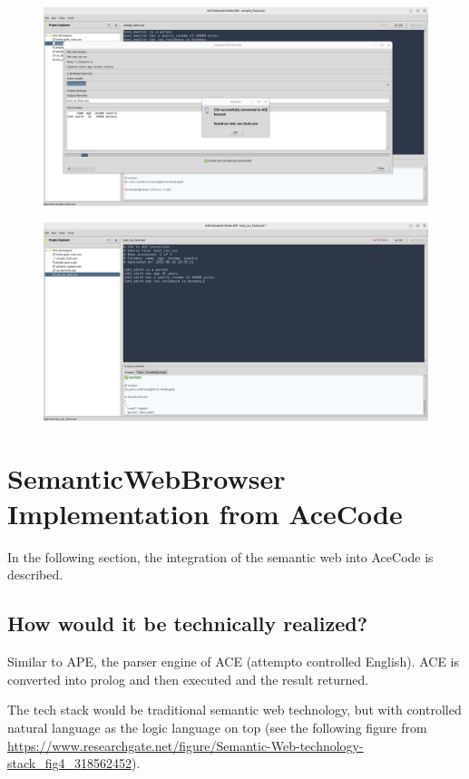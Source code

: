 \documentclass[12pt,a4paper]{article}
\begin{document}
\begin{figure}[h]
    \includegraphics[width=16cm]{ace_code_screenshot_3}
\end{figure}

\begin{figure}[h]
    \includegraphics[width=16cm]{ace_code_screenshot_4}
\end{figure}

\section{SemanticWebBrowser Implementation from AceCode}

In the following section, the integration of the semantic web into AceCode is described.

\subsection{How would it be technically realized?}

Similar to APE, the parser engine of ACE (attempto controlled English). ACE is converted into prolog and then executed and the result returned.

The tech stack would be traditional semantic web technology, but with controlled natural language as the logic language on top (see the following figure from \url{https://www.researchgate.net/figure/Semantic-Web-technology-stack_fig4_318562452}).
\end{document}
